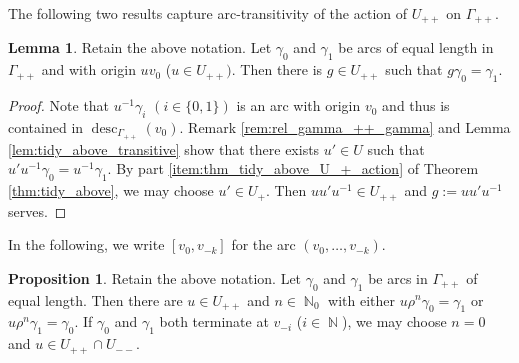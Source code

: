 \documentclass{article}
\DeclareMathOperator\desc{desc}
\DeclareMathOperator\bbN{\mathbb{N}}
\theoremstyle{definition}
\newtheorem{lemma}[theorem]{Lemma}
\newtheorem{proposition}[theorem]{Proposition}
\begin{document}
The following two results capture arc-transitivity of the action of $U_{++}$ on $\Gamma_{++}$.

\begin{lemma}\label{lem:basic_arc_trans}
Retain the above notation. Let $\gamma_0$ and $\gamma_1$ be arcs of equal length in $\Gamma_{++}$ and with origin $uv_0$ ($u\in U_{++})$. Then there is $g\in U_{++}$ such that $g\gamma_{0} = \gamma_{1}$.
\end{lemma}

\begin{proof}
Note that $u^{-1}\gamma_{i}$ $(i\in\{0,1\})$ is an arc with origin $v_0$ and thus is contained in $\desc_{\Gamma_{++}}(v_0)$. Remark \ref{rem:rel_gamma_++_gamma} and Lemma \ref{lem:tidy_above_transitive} show that there exists $u'\in U$ such that $u'u^{-1}\gamma_{0} = u^{-1}\gamma_{1}$. By part \ref{item:thm_tidy_above_U_+_action} of Theorem \ref{thm:tidy_above}, we may choose $u'\in U_{+}$. Then $uu'u^{-1}\in U_{++}$ and $g:=uu'u^{-1}$ serves.
\end{proof}

In the following, we write $[v_0,v_{-k}]$ for the arc $(v_0,\ldots, v_{-k})$. 

\begin{proposition}\label{prop:highly_arc_trans}
Retain the above notation. Let $\gamma_0$ and $\gamma_1$ be arcs in $\Gamma_{++}$ of equal length. Then there are $u\in U_{++}$ and $n\in\bbN_{0}$ with either $u\rho^{n}\gamma_{0} = \gamma_1$ or $u\rho^{n}\gamma_{1} = \gamma_0$. If $\gamma_0$ and $\gamma_1$ both terminate at $v_{-i}$ ($i\in\bbN$), we may choose $n=0$ and $u\in U_{++}\cap U_{--}$.
\end{proposition}
\end{document}
